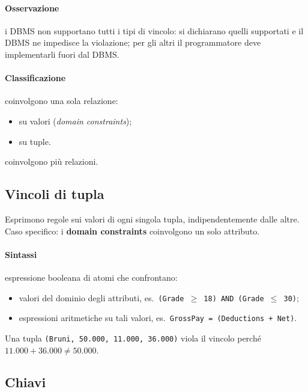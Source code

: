 \documentclass[a4paper,12pt]{article}
\begin{document}
\paragraph{Osservazione} i DBMS non supportano tutti i tipi di vincolo: si
dichiarano quelli supportati e il DBMS ne impedisce la violazione; per gli
altri il programmatore deve implementarli fuori dal DBMS.

\paragraph{Classificazione}
\begin{description}[style=nextline]
  \item[Intra-relazionali] coinvolgono una sola relazione:
    \begin{itemize}
      \item su valori (\emph{domain constraints});
      \item su tuple.
    \end{itemize}
  \item[Inter-relazionali] coinvolgono più relazioni.
\end{description}

\subsection{Vincoli di tupla}

Esprimono regole sui valori di ogni singola tupla, indipendentemente dalle
altre. Caso specifico: i \textbf{domain constraints} coinvolgono un solo
attributo.

\paragraph{Sintassi} espressione booleana di atomi che confrontano:
\begin{itemize}
  \item valori del dominio degli attributi, es.\
    \texttt{(Grade $\geq$ 18) AND (Grade $\leq$ 30)};
  \item espressioni aritmetiche su tali valori, es.\
    \texttt{GrossPay = (Deductions + Net)}.
\end{itemize}
Una tupla \texttt{(Bruni, 50.000, 11.000, 36.000)} viola il vincolo perché
$11.000 + 36.000 \neq 50.000$.

\subsection{Chiavi}
\end{document}
